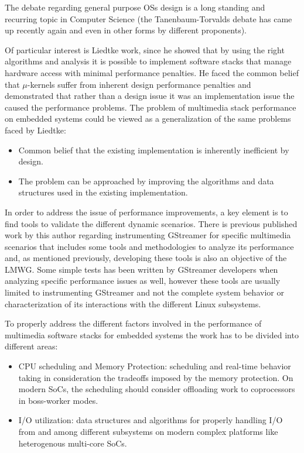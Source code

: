 The debate regarding general purpose \aclp{OS} design is a long standing and recurring topic in Computer Science (the Tanenbaum-Torvalds debate \cite{DiBona:1999:OSV:553109} has came up recently again\cite{Tanenbaum:fk} and even in other forms by different proponents\cite{Heiser:uq}). 

Of particular interest is Liedtke\citep{Liedtke:1995kx} work, since he showed that by using the right algorithms and analysis it is possible to implement software stacks that manage hardware access with minimal performance penalties. He faced the common belief that $\mu$-kernels suffer from inherent design performance penalties and demonstrated that rather than a design issue it was an implementation issue the caused the performance problems. The problem of multimedia stack performance on embedded systems could be viewed as a generalization of the same problems faced by Liedtke:
\begin{itemize}
\item Common belief that the existing implementation is inherently inefficient by design.
\item The problem can be approached by improving the algorithms and data structures used in the existing implementation.
\end{itemize}

In order to address the issue of performance improvements, a key element is to find tools to validate the different dynamic scenarios. There is previous published work by this author regarding instrumenting GStreamer for specific multimedia scenarios\cite{Dompe:2011ys} that includes some tools and methodologies to analyze its performance and, as mentioned previously, developing these tools is also an objective of the \ac{LMWG}. Some simple tests has been written by GStreamer developers when analyzing specific performance issues\cite{Contreras:vn} as well, however these tools are usually limited to instrumenting GStreamer and not the complete system behavior or characterization of its interactions with the different Linux subsystems.

To properly address the different factors involved in the performance of multimedia software stacks for embedded systems the work has to be divided into different areas:
\begin{itemize}
\item CPU scheduling and Memory Protection: scheduling and real-time behavior taking in consideration the tradeoffs imposed by the memory protection. On modern \acp{SoC}, the scheduling should consider offloading work to coprocessors in boss-worker modes.
\item I/O utilization: data structures and algorithms for properly handling I/O from and among different subsystems on modern complex platforms like heterogenous multi-core \acp{SoC}.
\end{itemize}

